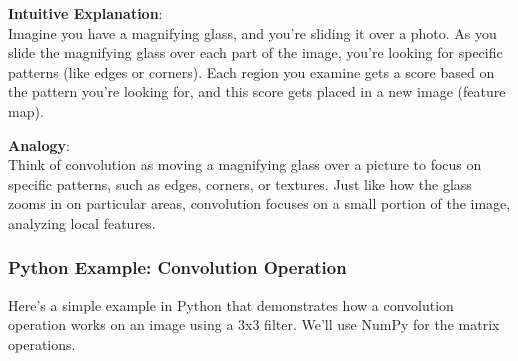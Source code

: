\documentclass[
  letterpaper,
  DIV=11,
  numbers=noendperiod]{scrreprt}
\begin{document}
\textbf{Intuitive Explanation}:\\
Imagine you have a magnifying glass, and you're sliding it over a photo.
As you slide the magnifying glass over each part of the image, you're
looking for specific patterns (like edges or corners). Each region you
examine gets a score based on the pattern you're looking for, and this
score gets placed in a new image (feature map).

\textbf{Analogy}:\\
Think of convolution as moving a magnifying glass over a picture to
focus on specific patterns, such as edges, corners, or textures. Just
like how the glass zooms in on particular areas, convolution focuses on
a small portion of the image, analyzing local features.

\subsubsection{Python Example: Convolution
Operation}\label{python-example-convolution-operation}

Here's a simple example in Python that demonstrates how a convolution
operation works on an image using a 3x3 filter. We'll use NumPy for the
matrix operations.
\end{document}

